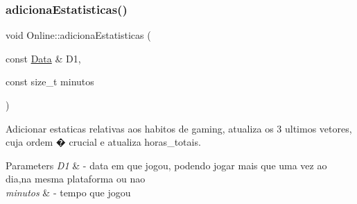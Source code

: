 \subsubsection{\texorpdfstring{adiciona\+Estatisticas()}{adicionaEstatisticas()}}
{\footnotesize\ttfamily void Online\+::adiciona\+Estatisticas (\begin{DoxyParamCaption}\item[{const \hyperlink{classData}{Data} \&}]{D1,  }\item[{const size\+\_\+t}]{minutos }\end{DoxyParamCaption})}



Adicionar estaticas relativas aos habitos de gaming, atualiza os 3 ultimos vetores, cuja ordem � crucial e atualiza horas\+\_\+totais. 


\begin{DoxyParams}{Parameters}
{\em D1} & -\/ data em que jogou, podendo jogar mais que uma vez ao dia,na mesma plataforma ou nao \\
\hline
{\em minutos} & -\/ tempo que jogou \\
\hline
\end{DoxyParams}

